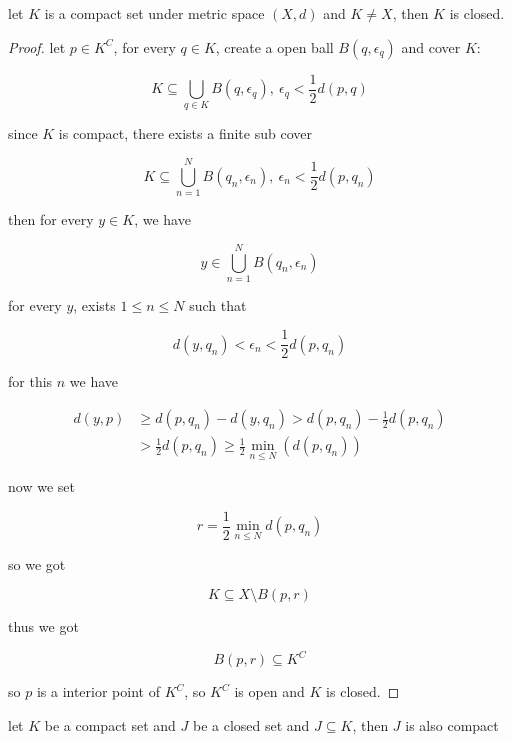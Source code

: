\begin{thm}
    let $K$ is a compact set under metric space $(X,d)$ and $K \ne X$, then $K$ is closed.
\end{thm}

\begin{proof}
    let $p \in K^C$, for every $q \in K$, create a open ball $B(q, \epsilon_q)$ and cover $K$:

    \[
        K \subseteq \bigcup_{q \in K} B(q, \epsilon_{q}), \: \epsilon_{q} < \frac{1}{2}d(p, q)
    \]

    since $K$ is compact, there exists a finite sub cover

    \[
    K \subseteq \bigcup_{n=1}^{N} B(q_n, \epsilon_{n}), \: \epsilon_{n} < \frac{1}{2}d(p, q_n)
    \]

    then for every $y \in K$, we have 

    \[
y \in \bigcup_{n=1}^{N} B(q_n, \epsilon_{n})
    \]

    for every $y$, exists $1 \le n \le N$ such that

    \[
        d(y, q_n) < \epsilon_n < \frac{1}{2}d(p, q_n)
    \]

    for this $n$ we have

    \begin{align*}
        d(y, p) &\ge d(p,q_n) - d(y, q_n) > d(p,q_n) - \frac{1}{2}d(p, q_n) \\
        & > \frac{1}{2}d(p, q_n) \ge \frac{1}{2}\min_{n \le N} \left( d(p, q_n) \right)
    \end{align*}

    now we set 

    \[
        r = \frac{1}{2}\min_{n \le N}d(p, q_n)
    \]


    so we got

    \[
        K \subseteq X \setminus B(p, r)
    \]

    thus we got

    \[
        B(p,r) \subseteq K^C
    \]

    so $p$ is a interior point of $K^C$, so $K^C$ is open and $K$ is closed.
\end{proof}

\begin{thm}
    \label{thm:2-3-4}
    let $K$ be a compact set and $J$ be a closed set and $J \subseteq K$, then $J$ is also compact
\end{thm}

